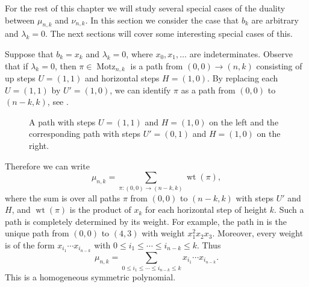 \documentclass[oneside]{book}
\numberwithin{equation}{section}
\theoremstyle{definition}
\newcommand\Motz{\operatorname{Motz}}
\newcommand\wt{\operatorname{wt}}
\newcommand\hlabel[3]{\node at (#1+0.5,#2+0.3) {\( #3 \)};}
\begin{document}
For the rest of this chapter we will study several special cases of
the duality between \( \mu_{n,k} \) and \( \nu_{n,k} \). In this
section we consider the case that \( b_k \) are arbitrary and
\( \lambda_k =0 \). The next sections will cover some interesting
special cases of this.

Suppose that \( b_k=x_{k} \) and \( \lambda_k =0 \), where \( x_0,x_1,\dots \) are
indeterminates. Observe that if \( \lambda_k=0 \), then
\( \pi\in \Motz_{n,k} \) is a path from \( (0,0)\to (n,k) \)
consisting of up steps \( U=(1,1) \) and horizontal steps
\( H=(1,0) \). By replacing each \( U=(1,1) \) by \( U'=(1,0) \), we
can identify \( \pi \) as a path from \( (0,0) \) to \( (n-k,k) \),
see .


\begin{figure}
  \centering
{} \qquad 
{}
\caption{A path with steps \( U=(1,1) \) and \( H=(1,0) \) on the left
  and the corresponding path with steps \( U'=(0,1) \) and
  \( H=(1,0) \) on the right.}
  \label{fig:6}
\end{figure}

Therefore we can write 
\[
  \mu_{n,k} = \sum_{\pi:(0,0)\to (n-k,k)} \wt(\pi),
\]
where the sum is over all paths \( \pi \) from \( (0,0) \) to
\( (n-k,k) \) with steps \( U' \) and \( H \), and \( \wt(\pi) \) is
the product of \( x_k \) for each horizontal step of height \( k \).
Such a path is completely determined by its weight. For example, the
path in  is the unique path from \( (0,0) \) to
\( (4,3) \) with weight \( x_1^2 x_2 x_3 \).
Moreover, every weight is of the form \( x_{i_1}\cdots x_{i_{n-k}} \)
with \( 0\le i_1 \le \cdots \le i_{n-k} \le k \).
Thus
\begin{equation}\label{eq:29}
  \mu_{n,k} = \sum_{0\le i_1 \le \cdots \le i_{n-k} \le k} x_{i_1}\cdots x_{i_{n-k}}.
\end{equation}
This is a homogeneous symmetric polynomial.
\end{document}
